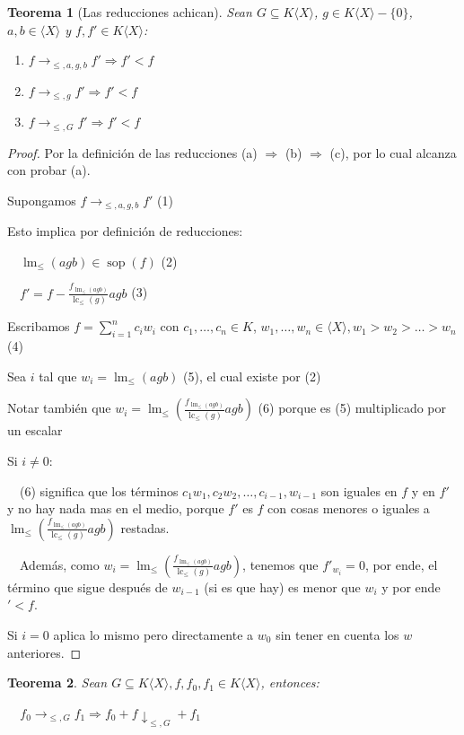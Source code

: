 \documentclass{amsbook}
\theoremstyle{customstyle}
\newtheorem{theorem}{Teorema}[section]
\DeclareMathOperator{\sop}{sop}
\DeclareMathOperator{\lm}{lm}
\DeclareMathOperator{\lc}{lc}
\begin{document}
\begin{theorem}[Las reducciones achican]\label{thm:→ achican}
Sean $G ⊆ K⟨X⟩$, $g ∈ K⟨X⟩ - \{0\}$, $a, b ∈ ⟨X⟩$ y $f, f' ∈ K⟨X⟩$:
\begin{enumerate}[label = (\alph*)]
\item $f →_{≤, a, g, b} f' ⇒ f' < f$

\item $f →_{≤, g} f' ⇒ f' < f$

\item $f →_{≤, G} f' ⇒ f' < f$
\end{enumerate}
\end{theorem}
\begin{proof}
Por la definición de las reducciones (a) $⇒$ (b) $⇒$ (c), por lo cual alcanza con probar (a).

Supongamos $f →_{≤, a, g, b} f'$ (1)

Esto implica por definición de reducciones:

  $\lm_≤(agb) ∈ \sop(f)$ (2)

  $f' = f - \frac{f_{\lm_≤(agb)}}{\lc_≤(g)}agb$ (3)

Escribamos $f = \sum_{i = 1}^n c_i w_i$ con $c_1, …, c_n ∈ K$, $w_1, …, w_n ∈ ⟨X⟩, w_1 > w_2 > … > w_n$ (4)

Sea $i$ tal que $w_i = \lm_≤(agb)$ (5), el cual existe por (2)

Notar también que $w_i = \lm_≤(\frac{f_{\lm_≤(agb)}}{\lc_≤(g)}agb)$ (6) porque es (5) multiplicado por un escalar

Si $i ≠ 0$:

  (6) significa que los términos $c_1 w_1, c_2 w_2, …, c_{i-1}, w_{i-1}$ son iguales en $f$ y en $f'$ y no hay nada mas en el medio, porque $f'$ es $f$ con cosas menores o iguales a $\lm_≤(\frac{f_{\lm_≤(agb)}}{\lc_≤(g)}agb)$ restadas.

  Además, como $w_i = \lm_≤(\frac{f_{\lm_≤(agb)}}{\lc_≤(g)}agb)$, tenemos que $f'_{w_i} = 0$, por ende, el término que sigue después de $w_{i-1}$ (si es que hay) es menor que $w_i$ y por ende $' < f$.

Si $i = 0$ aplica lo mismo pero directamente a $w_0$ sin tener en cuenta los $w$ anteriores.

\end{proof}

\begin{theorem}\label{thm:suma →↓}
Sean $G ⊆ K⟨X⟩, f, f_0, f_1 ∈ K⟨X⟩$, entonces:

  $f_0 →_{≤, G} f_1 ⇒ f_0 + f ↓_{≤, G} + f_1$

\end{theorem}
\end{document}

